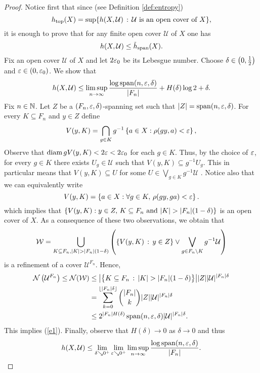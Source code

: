 \begin{proof}
Notice first that since (see Definition \ref{def:entropy})
\[
h_\mathrm{top}(X)=\sup\{h(X,\mathcal U)\,:\,\mathcal U\text{ is an open cover of }X\},
\]
it is enough to prove that for  any finite open cover $\mathcal U$ of $X$ one has 
\[
h(X, \mathcal U)\leq \tilde{h}_{\mathrm{span}}(X).
\]
Fix an open cover $\mathcal U$ of $X$ and let $2\varepsilon_0$ be its Lebesgue number.
Choose $\delta\in\left(0,\frac{1}{2}\right)$ and $\varepsilon\in(0,\varepsilon_0)$.
We show that 
\begin{equation}\label{e1}
h(X,\mathcal U)\leq \limsup\limits_{n\to\infty}\frac{\log \operatorname{span}(n,\varepsilon,\delta)}{|F_n|}+ H(\delta)\log 2+\delta.
\end{equation}
Fix $n\in\mathbb{N}$. Let $Z$ be a $(F_n,\varepsilon, \delta)$-spanning set such that $|Z|=\operatorname{span}(n,\varepsilon,\delta)$.
For every $K\subseteq F_n$ and $y\in Z$ define 
\[
V(y,K)=\bigcap_{g\in K}g^{-1}\left\{a\in X : \rho(gy,a)<\varepsilon\right\},
\]
Observe that $\operatorname{diam} gV(y,K) < 2\varepsilon<2\varepsilon_0$ for each $g\in K$. Thus, by the choice of $\varepsilon$, for every $g\in K$ there exists $U_g\in \mathcal U$ such that $V(y,K)\subseteq g^{-1}U_g$. This in particular means that $V(y,K)\subseteq U$ for some $U\in  \bigvee_{g\in K}g^{-1}\mathcal U$ .
Notice also that we can equivalently write 
\[
V(y,K) = \left\{a\in X : \forall g\in K,\, \rho(gy,ga)<\varepsilon\right\}.
\]
which implies that $\inbrace{V(y,K): y\in Z, \, K\subseteq F_n \text{ and } |K|>|F_n|(1-\delta)}$ is an open cover of $X$.
As a consequence of these two observations, we obtain that
\[
\mathcal W=\bigcup_{K\subseteq F_n,\\ |K|>|F_n|(1-\delta)}\left(\inbrace{V(y,K)\,:\,y\in Z}\vee\bigvee_{g\in F_n\setminus K}g^{-1}\mathcal U\right)
\]
is a refinement of a cover $\mathcal U^{F_n}$.
Hence,
\begin{align*}
\mathcal N\left(\mathcal U^{F_n}\right)\leq\mathcal N(\mathcal W)&\leq \big|\big\{K\subseteq F_n\,:\,|K|>|F_n|(1-\delta)\big\}\big| |Z| |\mathcal U|^{|F_n|\delta}\\
&=\sum_{k=0}^{\lfloor |F_n|\delta\rfloor}\binom{| F_n|}{k}|Z| |\mathcal U|^{|F_n|\delta}\\
&\leq 2^{|F_n|H(\delta)} \spn(n,\eps,\delta) |\mathcal U|^{|F_n|\delta}.
\end{align*}
This implies (\ref{e1}). Finally, observe that $H(\delta)\to 0$ as $\delta\to 0$ and thus
\[
h(X,\operatorname{\mathcal{U}})\leq \lim\limits_{\delta\searrow 0^+}\lim\limits_{\varepsilon\searrow 0^+}\limsup\limits_{n\to\infty}\frac{\log \operatorname{span}(n,\varepsilon, \delta)}{|F_n|}.\qedhere
\]
\end{proof}

